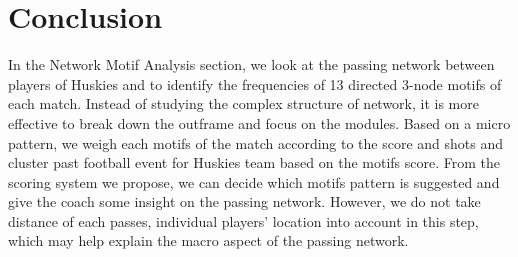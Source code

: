 \documentclass{mcmthesis}
\begin{document}
\section{Conclusion}

In the Network Motif Analysis section, we look at the passing network between players of Huskies and to identify the frequencies of 13 directed 3-node motifs of each match. Instead of studying the complex structure of network, it is more effective to break down the outframe and focus on the modules. Based on a micro pattern, we weigh each motifs of the match according to the score and shots and cluster past football event for Huskies team based on the motifs score. From the scoring system we propose, we can decide which motifs pattern is suggested and give the coach some insight on the passing network. However, we do not take distance of each passes, individual players’ location into account in this step, which may help explain the macro aspect of the passing network.
\end{document}
